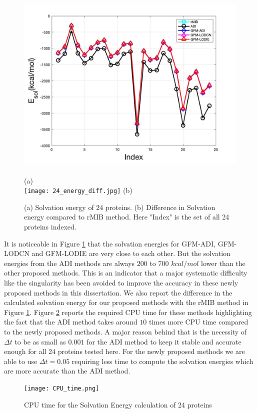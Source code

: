 \begin{figure}[H]
	\begin{center}		
	\includegraphics[width=\textwidth,height=270pt]{24_energy.jpg}\\
	(a)\\
\texttt{[image: 24\_energy\_diff.jpg]}
	(b)\\ 
	\end{center}
\caption{(a) Solvation energy of 24 proteins. (b) Difference in Solvation energy compared to rMIB method. Here "Index" is the set of all 24 proteins indexed.}
\label{fig:24protein}
\end{figure}
It is noticeable in Figure \ref{fig:24protein} that the solvation energies for GFM-ADI, GFM-LODCN and GFM-LODIE are very close to each other. But the solvation energies from the ADI methods are always $200$ to $700$ $kcal/mol$ lower than the other proposed methods. This is an indicator that a major systematic difficulty like the singularity has been avoided to improve the accuracy in these newly proposed methods in this dissertation. We  also report the difference in the calculated solvation energy for our proposed methods with the rMIB method in Figure \ref{fig:24protein}. Figure \ref{fig:CPU_24protein} reports the required CPU time for these methods highlighting the fact that the ADI method takes around $10$ times more CPU time compared to the newly proposed methods. A major reason behind that is the necessity of $\Delta t$ to be as small as $0.001$ for the ADI method to keep it stable and accurate enough for all 24 proteins tested here. For the newly proposed methods we are able to use $\Delta t =0.05$ requiring less time to compute the solvation energies which are more accurate than the ADI method.    
\begin{figure}[H]
	\begin{center}
		\texttt{[image: CPU\_time.png]}
	\end{center}
	\caption{CPU time for the Solvation Energy calculation of 24 proteins}
	\label{fig:CPU_24protein}
\end{figure}
